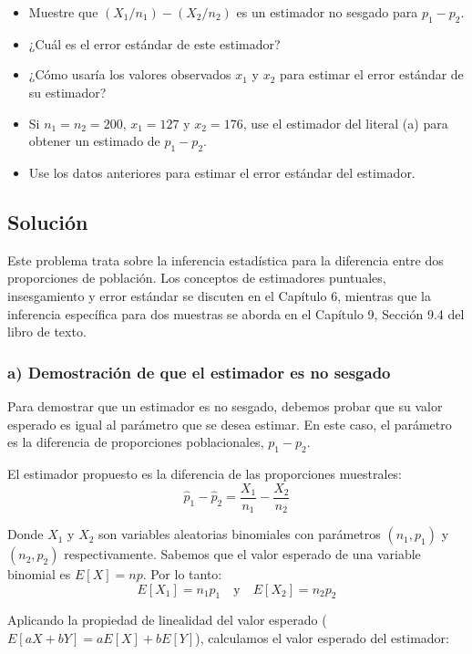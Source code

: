 \documentclass[12pt]{article}
\begin{document}
\begin{itemize}
    \item[a)] Muestre que $(X_1/n_1) - (X_2/n_2)$ es un estimador no sesgado para $p_1 - p_2$.
    \item[b)] ¿Cuál es el error estándar de este estimador?
    \item[c)] ¿Cómo usaría los valores observados $x_1$ y $x_2$ para estimar el error estándar de su estimador?
    \item[d)] Si $n_1 = n_2 = 200$, $x_1 = 127$ y $x_2 = 176$, use el estimador del literal (a) para obtener un estimado de $p_1 - p_2$.
    \item[e)] Use los datos anteriores para estimar el error estándar del estimador.
\end{itemize}

\subsection{Solución}

Este problema trata sobre la inferencia estadística para la diferencia entre dos proporciones de población. Los conceptos de estimadores puntuales, insesgamiento y error estándar se discuten en el Capítulo 6, mientras que la inferencia específica para dos muestras se aborda en el Capítulo 9, Sección 9.4 del libro de texto.

\subsubsection*{a) Demostración de que el estimador es no sesgado}

Para demostrar que un estimador es no sesgado, debemos probar que su valor esperado es igual al parámetro que se desea estimar. En este caso, el parámetro es la diferencia de proporciones poblacionales, $p_1 - p_2$.

El estimador propuesto es la diferencia de las proporciones muestrales:
$$ \hat{p}_1 - \hat{p}_2 = \frac{X_1}{n_1} - \frac{X_2}{n_2} $$

Donde $X_1$ y $X_2$ son variables aleatorias binomiales con parámetros $(n_1, p_1)$ y $(n_2, p_2)$ respectivamente. Sabemos que el valor esperado de una variable binomial es $E[X] = np$. Por lo tanto:
$$ E[X_1] = n_1 p_1 \quad \text{y} \quad E[X_2] = n_2 p_2 $$

Aplicando la propiedad de linealidad del valor esperado ($E[aX + bY] = aE[X] + bE[Y]$), calculamos el valor esperado del estimador:
\end{document}

